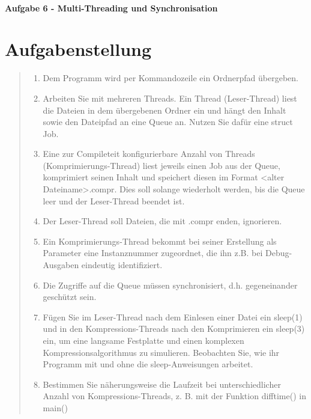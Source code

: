 \newpage

\paragraph{\LARGE Aufgabe 6 - Multi-Threading und Synchronisation}

\section{Aufgabenstellung}
	\begin{quote}
		\begin{enumerate}
			\item Dem Programm wird per Kommandozeile ein Ordnerpfad \"ubergeben.\\
			\item Arbeiten Sie mit mehreren Threads. Ein Thread (Leser-Thread) liest die Dateien in dem \"ubergebenen Ordner ein und h\"angt den Inhalt sowie den Dateipfad an eine Queue an. Nutzen Sie daf\"ur eine struct Job.\\ 
			\item Eine zur Compileteit konfigurierbare Anzahl von Threads (Komprimierungs-Thread) liest jeweils einen Job aus der Queue, komprimiert seinen Inhalt und speichert diesen im Format <alter Dateiname>.compr. Dies soll solange wiederholt werden, bis die Queue leer und der Leser-Thread beendet ist.\\
			\item Der Leser-Thread soll Dateien, die mit .compr enden, ignorieren.\\
			\item Ein Komprimierungs-Thread bekommt bei seiner Erstellung als Parameter eine Instanznummer zugeordnet, die ihn z.B. bei Debug-Ausgaben eindeutig identifiziert.\\
			\item Die Zugriffe auf die Queue m\"ussen synchronisiert, d.h. gegeneinander gesch\"utzt sein.\\
			\item F\"ugen Sie im Leser-Thread nach dem Einlesen einer Datei ein sleep(1) und in den Kompressions-Threads nach den Komprimieren ein sleep(3) ein, um eine langsame Festplatte und einen komplexen Kompressionsalgorithmus zu simulieren. Beobachten Sie, wie ihr Programm mit und ohne die sleep-Anweisungen arbeitet.\\
			\item Bestimmen Sie n\"aherungsweise die Laufzeit bei unterschiedlicher Anzahl von Kompressions-Threads, z. B. mit der Funktion difftime() in main()\\
		\end{enumerate}
	\end{quote}
\newpage
